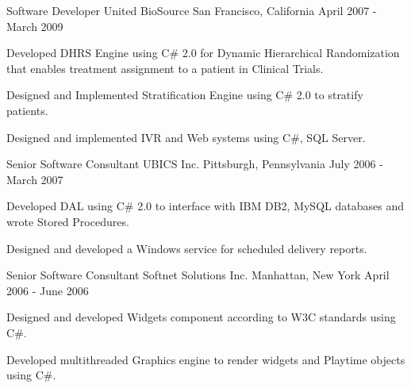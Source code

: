 \begin{cventries}
  \cventry
    {Software Developer} %
    {United BioSource} %
    {San Francisco, California} %
    {April 2007 - March 2009} %
    {
      \begin{cvitems} %
        \item {Developed DHRS Engine using C\# 2.0 for Dynamic Hierarchical Randomization that enables treatment assignment to a patient in Clinical Trials.} 
        \item {Designed and Implemented Stratification Engine using C\# 2.0 to stratify patients. }
        \item {Designed and implemented IVR and Web systems using C\#, SQL Server.}
      \end{cvitems}
    }

  \cventry
    {Senior Software Consultant} %
    {UBICS Inc.} %
    {Pittsburgh, Pennsylvania} %
    {July 2006 - March 2007} %
    {
      \begin{cvitems} %
      	\item {Developed DAL using C\# 2.0  to interface with IBM DB2, MySQL databases and wrote Stored Procedures.}
      	\item {Designed and developed a Windows service for scheduled delivery reports.}
      \end{cvitems}
    }

  \cventry
    {Senior Software Consultant} %
    {Softnet Solutions Inc.} %
    {Manhattan, New York} %
    {April 2006 - June 2006} %
    {
      \begin{cvitems} %
        \item { Designed and developed Widgets component according to W3C standards using C\#. }
        \item {Developed multithreaded Graphics engine to render widgets and Playtime objects using C\#. }
      \end{cvitems}
    }


\end{cventries}
